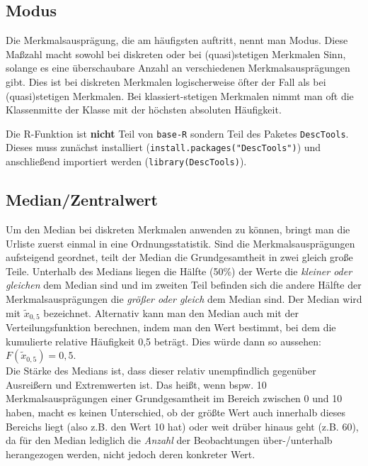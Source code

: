 \documentclass[a4paper]{article}
\newcommand\dangersign[1][2ex]{%
  \renewcommand\stacktype{L}%
  \scaleto{\stackon[1.3pt]{\color{red}$\triangle$}{\tiny !}}{#1}%
}
\begin{document}
\subsection{Modus}
Die Merkmalsausprägung, die am häufigsten auftritt, nennt man Modus. Diese Maßzahl macht sowohl bei diskreten oder bei (quasi)stetigen Merkmalen Sinn, solange es eine überschaubare Anzahl an verschiedenen Merkmalsausprägungen gibt. Dies ist bei diskreten Merkmalen logischerweise öfter der Fall als bei (quasi)stetigen Merkmalen. Bei klassiert-stetigen Merkmalen nimmt man oft die Klassenmitte der Klasse mit der höchsten absoluten Häufigkeit.\\

\noindent {}

\noindent \dangersign[3ex] Die R-Funktion ist \textbf{nicht} Teil von \texttt{base-R} sondern Teil des Paketes \texttt{DescTools}. Dieses muss zunächst installiert (\texttt{install.packages("DescTools")}) und anschließend importiert werden (\texttt{library(DescTools)}).

\subsection{Median/Zentralwert}\label{sec:median}
Um den Median bei diskreten Merkmalen anwenden zu können, bringt man die Urliste zuerst einmal in eine Ordnungsstatistik.
Sind die Merkmalsausprägungen aufsteigend geordnet, teilt der Median die Grundgesamtheit in zwei gleich große Teile. Unterhalb des Medians liegen die Hälfte (50\%) der Werte die \textit{kleiner oder gleichen} dem Median sind und im zweiten Teil befinden sich die andere Hälfte der Merkmalsausprägungen die \textit{größer oder gleich} dem Median sind. Der Median wird mit $\tilde{x}_{0,5}$ bezeichnet.
Alternativ kann man den Median auch mit der Verteilungsfunktion berechnen, indem man den Wert bestimmt, bei dem die kumulierte relative Häufigkeit 0,5 beträgt. Dies würde dann so aussehen: $F(\tilde{x}_{0,5})=0,5$.\\
Die Stärke des Medians ist, dass dieser relativ unempfindlich gegenüber Ausreißern und Extremwerten ist. Das heißt, wenn bspw. 10 Merkmalsausprägungen einer Grundgesamtheit im Bereich zwischen 0 und 10 haben, macht es keinen Unterschied, ob der größte Wert auch innerhalb dieses Bereichs liegt (also z.B. den Wert 10 hat) oder weit drüber hinaus geht (z.B. 60), da für den Median lediglich die \textit{Anzahl} der Beobachtungen über-/unterhalb herangezogen werden, nicht jedoch deren konkreter Wert.
\end{document}
